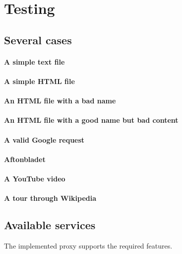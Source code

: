 \documentclass[12pt,a4paper]{article}
\begin{document}

\section{Testing}
\subsection{Several cases}
\paragraph{A simple text file}
\paragraph{A simple HTML file}
\paragraph{An HTML file with a bad name}
\paragraph{An HTML file with a good name but bad content}
\paragraph{A valid Google request}
\paragraph{Aftonbladet}
\paragraph{A YouTube video}
\paragraph{A tour through Wikipedia}

\subsection{Available services} 
The implemented proxy supports the required features.
\end{document}
